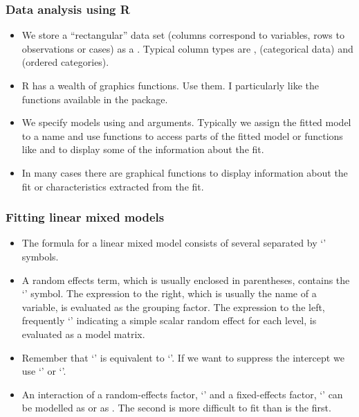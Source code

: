 
\begin{frame}
  \frametitle{Data analysis using R}
  \begin{itemize}
  \item We store a ``rectangular'' data set (columns correspond to
    variables, rows to observations or cases) as a .
    Typical column types are , 
    (categorical data) and  (ordered categories).
  \item R has a wealth of graphics functions.  Use them.  I
    particularly like the functions available in the 
    package.
  \item We specify models using  and 
    arguments. Typically we assign the fitted model to a name and use
     functions to access parts of the fitted model or
    functions like  and  to display some of
    the information about the fit.
  \item In many cases there are graphical functions to display
    information about the fit or characteristics extracted from the
    fit.
  \end{itemize}
\end{frame}

\begin{frame}
  \frametitle{Fitting linear mixed models}
  \begin{itemize}
  \item The formula for a linear mixed model consists of several
     separated by `\code{+}' symbols.
  \item A random effects term, which is usually enclosed in
    parentheses, contains the `\code{|}' symbol.  The expression to
    the right, which is usually the name of a variable, is evaluated
    as the grouping factor.  The expression to the left, frequently
    `' indicating a simple scalar random effect for each
    level, is evaluated as a model matrix.
  \item Remember that `' is equivalent to
    `'.  If we want to suppress the intercept we use
    `' or `'.
  \item An interaction of a random-effects factor, `' and a
    fixed-effects factor, `' can be modelled as
     or as .  The second
    is more difficult to fit than is the first.
  \end{itemize}
\end{frame}

